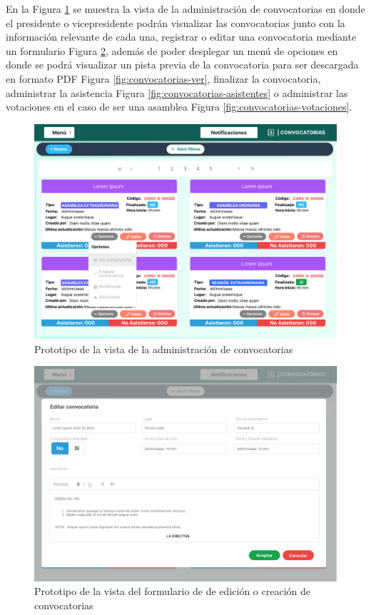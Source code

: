 En la Figura \ref{fig:convocatorias} se muestra la vista de la administración de convocatorias en donde el presidente o vicepresidente podrán visualizar las convocatorias junto con la información relevante de cada una, registrar o editar una convocatoria mediante un formulario Figura \ref{fig:convocatorias-edit}, además de poder desplegar un menú de opciones en donde se podrá visualizar un pista previa de la convocatoria para ser descargada en formato PDF Figura \ref{fig:convocatorias-ver}, finalizar la convocatoria, administrar la asistencia Figura \ref{fig:convocatorias-asistentes} o administrar las votaciones en el caso de ser una asamblea Figura \ref{fig:convocatorias-votaciones}.

\begin{figure}[H]
    \centering
    \includegraphics[width=1\textwidth]{resources/images/convocatorias}
    \caption{Prototipo de la vista de la administración de convocatorias}
    \label{fig:convocatorias}
\end{figure}

\begin{figure}[H]
    \centering
    \includegraphics[width=1\textwidth]{resources/images/convocatorias_edit}
    \caption{Prototipo de la vista del formulario de de edición o creación de convocatorias}
    \label{fig:convocatorias-edit}
\end{figure}


